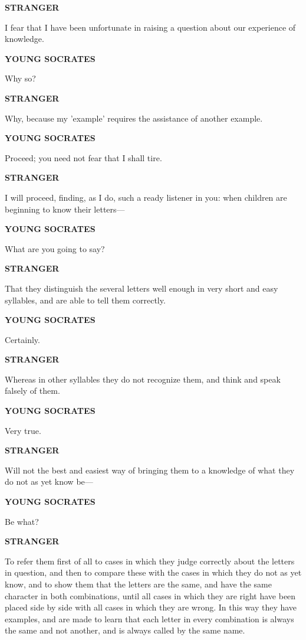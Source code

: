 \documentclass[11pt,letter]{article}
\begin{document}
\par \textbf{STRANGER}
\par   I fear that I have been unfortunate in raising a question about our experience of knowledge.

\par \textbf{YOUNG SOCRATES}
\par   Why so?

\par \textbf{STRANGER}
\par   Why, because my 'example' requires the assistance of another example.

\par \textbf{YOUNG SOCRATES}
\par   Proceed; you need not fear that I shall tire.

\par \textbf{STRANGER}
\par   I will proceed, finding, as I do, such a ready listener in you:  when children are beginning to know their letters—

\par \textbf{YOUNG SOCRATES}
\par   What are you going to say?

\par \textbf{STRANGER}
\par   That they distinguish the several letters well enough in very short and easy syllables, and are able to tell them correctly.

\par \textbf{YOUNG SOCRATES}
\par   Certainly.

\par \textbf{STRANGER}
\par   Whereas in other syllables they do not recognize them, and think and speak falsely of them.

\par \textbf{YOUNG SOCRATES}
\par   Very true.

\par \textbf{STRANGER}
\par   Will not the best and easiest way of bringing them to a knowledge of what they do not as yet know be—

\par \textbf{YOUNG SOCRATES}
\par   Be what?

\par \textbf{STRANGER}
\par   To refer them first of all to cases in which they judge correctly about the letters in question, and then to compare these with the cases in which they do not as yet know, and to show them that the letters are the same, and have the same character in both combinations, until all cases in which they are right have been placed side by side with all cases in which they are wrong. In this way they have examples, and are made to learn that each letter in every combination is always the same and not another, and is always called by the same name.
\end{document}
